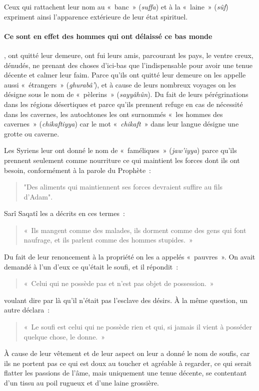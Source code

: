 Ceux qui rattachent leur nom au «~banc~» (\emph{suffa}) et à la
«~laine~» (\emph{sûf}) expriment ainsi l'apparence extérieure de leur
état spirituel. \paragraph{ Ce sont en effet des hommes qui ont délaissé ce bas
monde}, ont quitté leur demeure, ont fui leurs amis, parcourant les pays,
le ventre creux, dénudés, ne prenant des choses d'ici-bas que
l'indispensable pour avoir une tenue décente et calmer leur faim. Parce
qu'ils ont quitté leur demeure on les appelle aussi «~étrangers~»
(\emph{ghurabâ'}), et à cause de leurs nombreux voyages on les désigne
sous le nom de «~pèlerins~» (\emph{sayyâhûn}). Du fait de leurs
pérégrinations dans les régions désertiques et parce qu'ils prennent
refuge en cas de nécessité dans les cavernes, les autochtones les ont
surnommés «~les hommes des cavernes~» (\emph{chikaftiyya}) car le mot
«~\emph{chikaft}~» dans leur langue désigne une grotte ou caverne.

Les Syriens leur ont donné le nom de «~faméliques~» (\emph{jaw'iyya})
parce qu'ils prennent seulement comme nourriture ce qui maintient les
forces dont ils ont besoin, conformément à la parole du Prophète~:
\begin{quote}
"Des aliments qui maintiennent ses forces devraient suffire au fils
d'Adam".~     
\end{quote}
Sarî Saqatî les a décrits en ces termes~: 
\begin{quote}
    «~Ils mangent
comme des malades, ils dorment comme des gens qui font naufrage, et ils
parlent comme des hommes stupides.~»
\end{quote}

Du fait de leur renoncement à la propriété on les a appelés «~pauvres~».
On avait demandé à l'un d'eux ce qu'était le soufi, et il répondit~:
\begin{quote}
   «~Celui qui ne possède pas et n'est pas objet de possession.~» 
\end{quote}
voulant
dire par là qu'il n'était pas l'esclave des désirs. À la même question,
un autre déclara~: 
\begin{quote}
    «~Le soufi est celui qui ne possède rien et qui, si
jamais il vient à posséder quelque chose, le donne.~»
\end{quote}


À cause de leur vêtement et de leur aspect on leur a donné le nom de
soufis, car ils ne portent pas ce qui est doux au toucher et agréable à
regarder, ce qui serait flatter les passions de l'âme, mais uniquement
une tenue décente, se contentant d'un tissu au poil rugueux et d'une
laine grossière.

